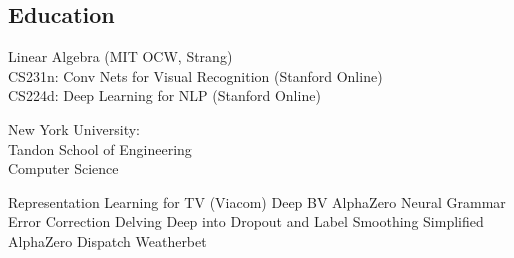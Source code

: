 \documentclass[]{deedy-resume-openfont}
\begin{document}
\begin{minipage}[t]{0.36\textwidth}
\subsection{Education}
 \vspace{0.5em}

\vspace{0.5em}
Linear Algebra (MIT OCW, Strang) \\
CS231n: Conv Nets for Visual Recognition (Stanford Online) \\
CS224d: Deep Learning for NLP (Stanford Online) \\
\sectionsep




New York University: \\
Tandon School of Engineering \\
Computer Science
\sectionsep


Representation Learning for TV (Viacom)       \textbullet{} %
Deep BV                                       \textbullet{} %
AlphaZero Neural Grammar Error Correction     \textbullet{} %
Delving Deep into Dropout and Label Smoothing \textbullet{} %
Simplified AlphaZero                          \textbullet{} %
Dispatch                                      \textbullet{} %
Weatherbet                                    %
\sectionsep




\end{minipage}
\end{document}
